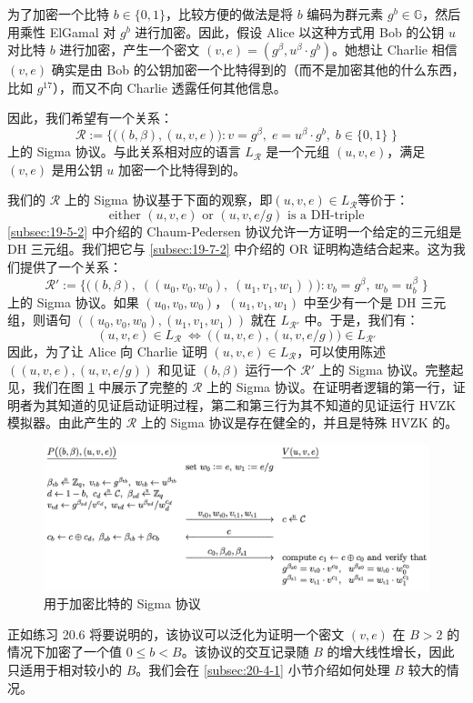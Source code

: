 \begin{example}[加密后的比特]\label{exmp:20-3}
为了加密一个比特 $b\in\{0,1\}$，比较方便的做法是将 $b$ 编码为群元素 $g^b\in\mathbb{G}$，然后用乘性 ElGamal 对 $g^b$ 进行加密。因此，假设 Alice 以这种方式用 Bob 的公钥 $u$ 对比特 $b$ 进行加密，产生一个密文 $(v,e)=(g^\beta,u^\beta\cdot{g^b})$。她想让 Charlie 相信 $(v,e)$ 确实是由 Bob 的公钥加密一个比特得到的（而不是加密其他的什么东西，比如 $g^{17}$），而又不向 Charlie 透露任何其他信息。

因此，我们希望有一个关系：
$$
\mathcal{R}:=
\bigg\lbrace
\Big(
(b,\beta),(u,v,e)
\Big):
v=g^\beta,\;
e=u^\beta\cdot g^b,\;
b\in\{0,1\}\;
\bigg\rbrace
$$
上的 Sigma 协议。与此关系相对应的语言 $L_{\mathcal R}$ 是一个元组 $(u,v,e)$，满足 $(v,e)$ 是用公钥 $u$ 加密一个比特得到的。

我们的 $\mathcal{R}$ 上的 Sigma 协议基于下面的观察，即$(u,v,e)\in L_{\mathcal R}$等价于：
$$
\text{either }
(u,v,e)
\text{ or }
(u,v,{e}/{g})
\text{ is a DH-triple}
$$
\ref{subsec:19-5-2} 中介绍的 Chaum-Pedersen 协议允许一方证明一个给定的三元组是 DH 三元组。我们把它与 \ref{subsec:19-7-2} 中介绍的 OR 证明构造结合起来。这为我们提供了一个关系：
$$
\mathcal{R}':=
\bigg\lbrace
\Big(
(b,\beta),\;((u_0,v_0,w_0),\;(u_1,v_1,w_1))
\Big):
v_b=g^\beta,~
w_b=u_b^\beta\;
\bigg\rbrace
$$
上的 Sigma 协议。如果 $(u_0,v_0,w_0)$，$(u_1,v_1,w_1)$ 中至少有一个是 DH 三元组，则语句 $((u_0,v_0,w_0),(u_1,v_1,w_1))$ 就在 $L_{\mathcal{R}'}$ 中。于是，我们有：
$$
(u,v,e)\in L_{\mathcal R}\ \iff\ 
\Big((u,v,e),(u,v,{e}/{g})\Big)\in L_{\mathcal R'}
$$
因此，为了让 Alice 向 Charlie 证明 $(u,v,e)\in L_{\mathcal{R}}$，可以使用陈述 $((u,v,e),(u,v,{e}/{g}))$ 和见证 $(b,\beta)$ 运行一个 $\mathcal{R}'$ 上的 Sigma 协议。完整起见，我们在图 \ref{fig:20-1} 中展示了完整的 $\mathcal R$ 上的 Sigma 协议。在证明者逻辑的第一行，证明者为其知道的见证启动证明过程，第二和第三行为其不知道的见证运行 HVZK 模拟器。由此产生的 $\mathcal R$ 上的 Sigma 协议是存在健全的，并且是特殊 HVZK 的。

\begin{figure}
  \centering
  \includegraphics[width=0.85\linewidth]{figures/chapter20/fig1.png}
  \caption{用于加密比特的 Sigma 协议}
  \label{fig:20-1}
\end{figure}

正如练习 20.6 将要说明的，该协议可以泛化为证明一个密文 $(v,e)$ 在 $B>2$ 的情况下加密了一个值 $0\leq b < B$。该协议的交互记录随 $B$ 的增大线性增长，因此只适用于相对较小的 $B$。我们会在 \ref{subsec:20-4-1} 小节介绍如何处理 $B$ 较大的情况。
\end{example}

